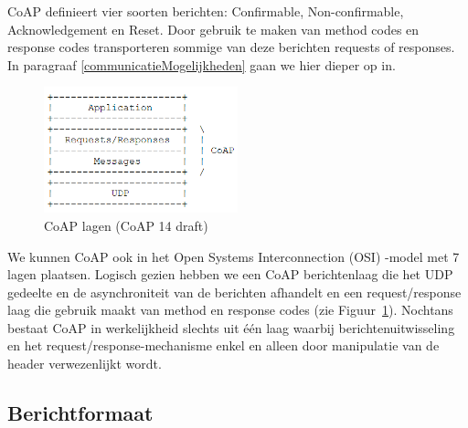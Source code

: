 CoAP definieert vier soorten berichten: Confirmable, Non-confirmable, Acknowledgement en Reset. Door gebruik te maken van method codes en response codes transporteren sommige van deze berichten requests of responses. In paragraaf \ref{communicatieMogelijkheden} gaan we hier dieper op in.\\

\begin{figure}
\vspace{-10pt}
\includegraphics[width=0.5\textwidth]{fig/CoAPLaag}
\vspace{-30pt}
\caption{CoAP lagen (CoAP 14 draft)}
\vspace{-5pt}
\label{fig:CoAPLaag}
\end{figure}
We kunnen CoAP ook in het Open Systems Interconnection (OSI) -model  met 7 lagen plaatsen. Logisch gezien hebben we een CoAP berichtenlaag die het UDP gedeelte en de asynchroniteit van de berichten afhandelt en een request/response laag die gebruik maakt van method en response codes (zie Figuur~\ref{fig:CoAPLaag}). Nochtans bestaat CoAP in werkelijkheid slechts uit \'{e}\'{e}n laag waarbij berichtenuitwisseling en het request/response-mechanisme enkel en alleen door manipulatie van de header verwezenlijkt wordt.

\subsection{Berichtformaat}

